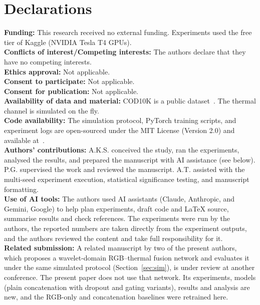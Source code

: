 \documentclass[runningheads]{llncs}
\begin{document}
\section*{Declarations}
\textbf{Funding:} This research received no external funding. Experiments used the free tier of Kaggle (NVIDIA Tesla T4 GPUs).\\
\textbf{Conflicts of interest/Competing interests:} The authors declare that they have no competing interests.\\
\textbf{Ethics approval:} Not applicable.\\
\textbf{Consent to participate:} Not applicable.\\
\textbf{Consent for publication:} Not applicable.\\
\textbf{Availability of data and material:} COD10K is a public dataset~\cite{sinet}. The thermal channel is simulated on the fly.\\
\textbf{Code availability:} The simulation protocol, PyTorch training scripts, and experiment logs are open-sourced under the MIT License (Version 2.0) and available at~\cite{githubrepo}.\\
\textbf{Authors' contributions:} A.K.S. conceived the study, ran the experiments, analysed the results, and prepared the manuscript with AI assistance (see below). P.G. supervised the work and reviewed the manuscript. A.T. assisted with the multi-seed experiment execution, statistical significance testing, and manuscript formatting.\\
\textbf{Use of AI tools:} The authors used AI assistants (Claude, Anthropic, and Gemini, Google) to help plan experiments, draft code and \LaTeX{} source, summarise results and check references. The experiments were run by the authors, the reported numbers are taken directly from the experiment outputs, and the authors reviewed the content and take full responsibility for it.\\
\textbf{Related submission:} A related manuscript by two of the present authors, which proposes a wavelet-domain RGB--thermal fusion network and evaluates it under the same simulated protocol (Section~\ref{sec:sim}), is under review at another conference. The present paper does not use that network. Its experiments, models (plain concatenation with dropout and gating variants), results and analysis are new, and the RGB-only and concatenation baselines were retrained here.
\end{document}
